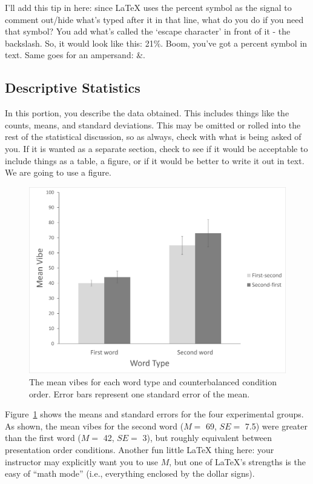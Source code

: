 \documentclass[stu,12pt,floatsintext]{apa7}
\begin{document}
I'll add this tip in here: since \LaTeX{} uses the percent symbol as the signal to comment out/hide what's typed after it in that line, what do you do if you need that symbol? You add what's called the `escape character' in front of it - the backslash. So, it would look like this: 21\%. Boom, you've got a percent symbol in text. Same goes for an ampersand: \&.

\subsection{Descriptive Statistics}

In this portion, you describe the data obtained. This includes things like the counts, means, and standard deviations. This may be omitted or rolled into the rest of the statistical discussion, so as always, check with what is being asked of you. If it is wanted as a separate section, check to see if it would be acceptable to include things as a table, a figure, or if it would be better to write it out in text. We are going to use a figure.

\begin{figure}
    \centering
    \includegraphics[width=0.75\linewidth]{sampleFig.png} %
    \caption{The mean vibes for each word type and counterbalanced condition order. Error bars represent one standard error of the mean.}
    \label{fig:OverallEffect}
\end{figure}

Figure~\ref{fig:OverallEffect} shows the means and standard errors for the four experimental groups. As shown, the mean vibes for the second word ($M = $ 69, $SE = $ 7.5) were greater than the first word ($M = $ 42, $SE = $ 3), but roughly equivalent between presentation order conditions. Another fun little \LaTeX{} thing here: your instructor may explicitly want you to use $M$, but one of \LaTeX{}'s strengths is the easy of ``math mode'' (i.e., everything enclosed by the dollar signs). %
\end{document}

